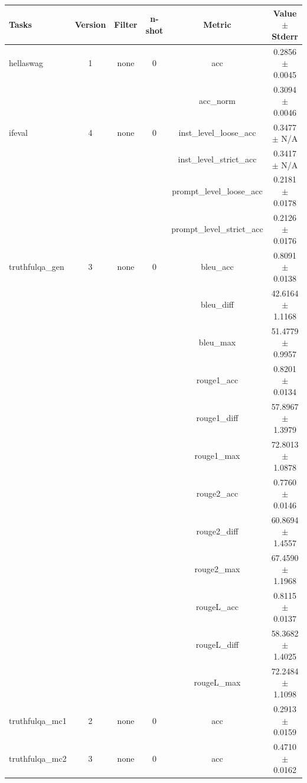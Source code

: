 \documentclass{ifacconf}
\begin{document}
\begin{strip}
\begin{minipage}{\textwidth}
    \begin{table}[H]
    \centering
    \begin{tabular}{|l|c|c|c|c|c|}
    \hline
    \textbf{Tasks} & \textbf{Version} & \textbf{Filter} & \textbf{n-shot} & \textbf{Metric} & \textbf{Value} $\pm$ \textbf{Stderr} \\ \hline
    hellaswag & 1 & none & 0 & acc & 0.2856 $\pm$ 0.0045 \\ \hline
    & & & & acc\_norm & 0.3094 $\pm$ 0.0046 \\ \hline
    ifeval & 4 & none & 0 & inst\_level\_loose\_acc & 0.3477 $\pm$ N/A \\ \hline
    & & & & inst\_level\_strict\_acc & 0.3417 $\pm$ N/A \\ \hline
    & & & & prompt\_level\_loose\_acc & 0.2181 $\pm$ 0.0178 \\ \hline
    & & & & prompt\_level\_strict\_acc & 0.2126 $\pm$ 0.0176 \\ \hline
    truthfulqa\_gen & 3 & none & 0 & bleu\_acc & 0.8091 $\pm$ 0.0138 \\ \hline
    & & & & bleu\_diff & 42.6164 $\pm$ 1.1168 \\ \hline
    & & & & bleu\_max & 51.4779 $\pm$ 0.9957 \\ \hline
    & & & & rouge1\_acc & 0.8201 $\pm$ 0.0134 \\ \hline
    & & & & rouge1\_diff & 57.8967 $\pm$ 1.3979 \\ \hline
    & & & & rouge1\_max & 72.8013 $\pm$ 1.0878 \\ \hline
    & & & & rouge2\_acc & 0.7760 $\pm$ 0.0146 \\ \hline
    & & & & rouge2\_diff & 60.8694 $\pm$ 1.4557 \\ \hline
    & & & & rouge2\_max & 67.4590 $\pm$ 1.1968 \\ \hline
    & & & & rougeL\_acc & 0.8115 $\pm$ 0.0137 \\ \hline
    & & & & rougeL\_diff & 58.3682 $\pm$ 1.4025 \\ \hline
    & & & & rougeL\_max & 72.2484 $\pm$ 1.1098 \\ \hline
    truthfulqa\_mc1 & 2 & none & 0 & acc & 0.2913 $\pm$ 0.0159 \\ \hline
    truthfulqa\_mc2 & 3 & none & 0 & acc & 0.4710 $\pm$ 0.0162 \\ \hline
    \end{tabular}
    \label{tab:gemma2_q6k}
    \end{table}


\end{minipage}
\end{strip}
\end{document}
